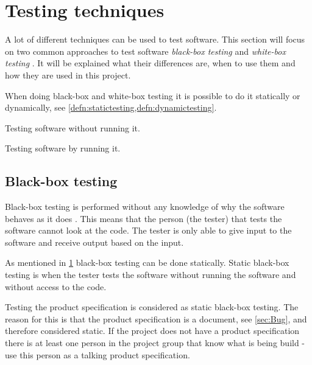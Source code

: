 \section{Testing techniques} \label{sec:testingtechniques}
A lot of different techniques can be used to test software.
This section will focus on two common approaches to test software \textit{black-box testing} and \textit{white-box testing} \cite{SoftwareTesting}.
It will be explained what their differences are, when to use them and how they are used in this project.

When doing black-box and white-box testing it is possible to do it statically or dynamically, see \cref{defn:statictesting,defn:dynamictesting}.

\begin{defn} \label{defn:statictesting}
Testing software without running it.
\end{defn}

\begin{defn} \label{defn:dynamictesting}
Testing software by running it.
\end{defn}

\subsection{Black-box testing} \label{sec:blackboxtesting}
Black-box testing is performed without any knowledge of why the software behaves as it does \cite{SoftwareTesting}.
This means that the person (the tester) that tests the software cannot look at the code.
The tester is only able to give input to the software and receive output based on the input.

As mentioned in \cref{sec:testingtechniques} black-box testing can be done statically.
Static black-box testing is when the tester tests the software without running the software and without access to the code.

Testing the product specification is considered as static black-box testing.
The reason for this is that the product specification is a document, see \cref{sec:Bug}, and therefore considered static.
If the project does not have a product specification there is at least one person in the project group that know what is being build - use this person as a talking product specification. \cite{SoftwareTesting}

